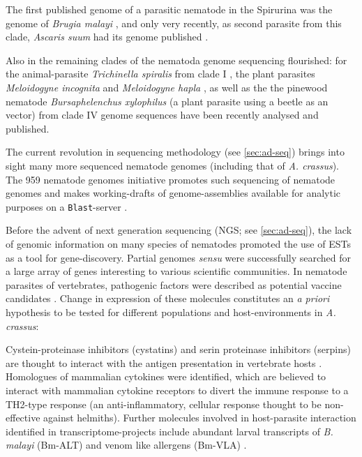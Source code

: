 The first published genome of a parasitic nematode in the Spirurina
was the genome of \textit{Brugia malayi} \cite{ghedin_draft_2007}, and
only very recently, as second parasite from this clade,
\textit{Ascaris suum} had its genome published \cite{pmid22031327}.

Also in the remaining clades of the nematoda genome sequencing
flourished: for the animal-parasite \textit{Trichinella spiralis} from
clade I \cite{pmid21336279}, the plant parasites \textit{Meloidogyne
  incognita} \cite{pmid18660804} and \textit{Meloidogyne hapla}
\cite{pmid18809916}, as well as the the pinewood nematode
\textit{Bursaphelenchus xylophilus} \cite{pmid21909270} (a plant
parasite using a beetle as an vector) from clade IV genome sequences
have been recently analysed and published.

The current revolution in sequencing methodology (see
\ref{sec:ad-seq}) brings into sight many more sequenced nematode
genomes (including that of \textit{A. crassus}). The 959 nematode
genomes initiative promotes such sequencing of nematode genomes and
makes working-drafts of genome-assemblies available for analytic
purposes on a \texttt{Blast}-server \cite{pmid22058131}.

Before the advent of next generation sequencing (NGS; see
\ref{sec:ad-seq}), the lack of genomic information on many species of
nematodes promoted the use of ESTs as a tool for
gene-discovery. Partial genomes \textit{sensu}
\cite{parkinson_partigene--constructing_2004} were successfully
searched for a large array of genes interesting to various scientific
communities. In nematode parasites of vertebrates, pathogenic factors
were described as potential vaccine candidates
\cite{pmid11406138}. Change in expression of these molecules
constitutes an \textit{a priori} hypothesis to be tested for different
populations and host-environments in \textit{A. crassus}:

Cystein-proteinase inhibitors (cystatins) and serin proteinase
inhibitors (serpins) are thought to interact with the antigen
presentation in vertebrate hosts \cite{pmid11406138}. Homologues of
mammalian cytokines were identified, which are believed to interact
with mammalian cytokine receptors to divert the immune response to a
TH2-type response \cite{maizels_helminth_2004} (an anti-inflammatory,
cellular response thought to be non-effective against
helmiths). Further molecules involved in host-parasite interaction
identified in transcriptome-projects include abundant larval
transcripts of \textit{B. malayi} (Bm-ALT)
\cite{gomez-escobar_abundant_2002} and venom like allergens (Bm-VLA)
\cite{pmid11704277}.

